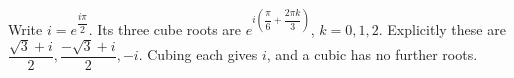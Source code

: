Write $i=e^{\dfrac{i\pi}{2}}$. Its three cube roots are $e^{i(\dfrac{\pi}{6}+\dfrac{2\pi k}{3})}$, $k=0,1,2$. Explicitly these are $\boxed{\dfrac{\sqrt3+i}{2},\dfrac{-\sqrt3+i}{2},-i}$. Cubing each gives $i$, and a cubic has no further roots.
